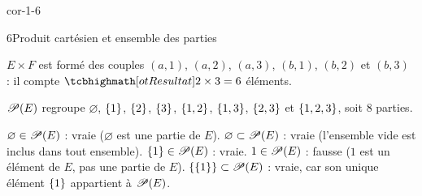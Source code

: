 \begin{blocLivre}{cor-1-6}
\begin{corrige}{6}{Produit cartésien et ensemble des parties}
\begin{questions}
  \item $E\times F$ est formé des couples $(a,1)$, $(a,2)$, $(a,3)$, $(b,1)$, $(b,2)$ et $(b,3)$ :
    il compte $\res{2\times3=6}$ éléments.
  \item $\mathscr{P}(E)$ regroupe $\varnothing$, $\left\{1\right\}$, $\left\{2\right\}$, $\left\{3\right\}$, $\left\{1,2\right\}$,
    $\left\{1,3\right\}$, $\left\{2,3\right\}$ et $\left\{1,2,3\right\}$, soit $8$ parties.
  \item $\varnothing\in\mathscr{P}(E)$ : vraie ($\varnothing$ est une partie de $E$).
    $\varnothing\subset\mathscr{P}(E)$ : vraie (l'ensemble vide est inclus dans tout ensemble).
    $\left\{1\right\}\in\mathscr{P}(E)$ : vraie. $1\in\mathscr{P}(E)$ : fausse ($1$ est un élément de $E$, pas une
    partie de $E$). $\left\{\left\{1\right\}\right\}\subset\mathscr{P}(E)$ : vraie, car son unique élément $\left\{1\right\}$
    appartient à $\mathscr{P}(E)$.
\end{questions}
\end{corrige}
\end{blocLivre}

